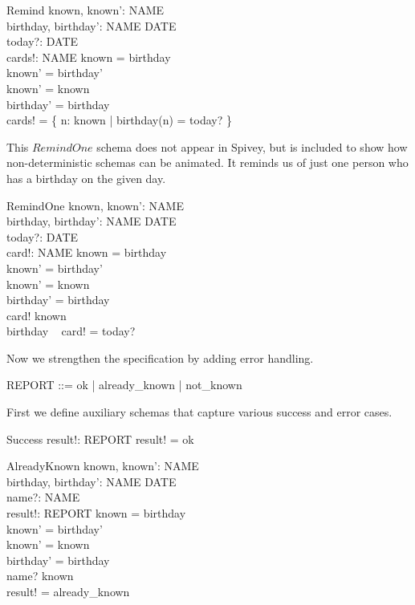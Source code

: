 \documentclass{article}
\begin{document}
\begin{schema}{Remind}
    known, known': \power NAME \\
    birthday, birthday': NAME \pfun DATE \\
    today?: DATE \\
    cards!: \power NAME
\where
    known = \dom birthday \\
    known' = \dom birthday' \\
    known' = known \\
    birthday' = birthday \\
    cards! = \{ n: known | birthday(n) = today? \}
\end{schema}

This $RemindOne$ schema does not appear in Spivey, but is
included to show how non-deterministic schemas can be animated.
It reminds us of just one person who has a birthday on the given 
day.
\begin{schema}{RemindOne}
    known, known': \power NAME \\
    birthday, birthday': NAME \pfun DATE \\
    today?: DATE \\
    card!: NAME
\where
    known = \dom birthday \\
    known' = \dom birthday' \\
    known' = known \\
    birthday' = birthday \\
    card! \in known \\
    birthday ~ card! = today?
\end{schema}


Now we strengthen the specification by adding error handling.

\begin{zed} 
    REPORT ::= ok | already\_known | not\_known
\end{zed}

First we define auxiliary schemas that capture various success
and error cases.

\begin{schema}{Success}
    result!: REPORT
\where
    result! = ok
\end{schema}

\begin{schema}{AlreadyKnown}
    known, known': \power NAME \\
    birthday, birthday': NAME \pfun DATE \\
    name?: NAME \\
    result!: REPORT
\where
    known = \dom birthday \\
    known' = \dom birthday' \\
    known' = known \\
    birthday' = birthday \\
    name? \in known \\
    result! = already\_known
\end{schema}
\end{document}
